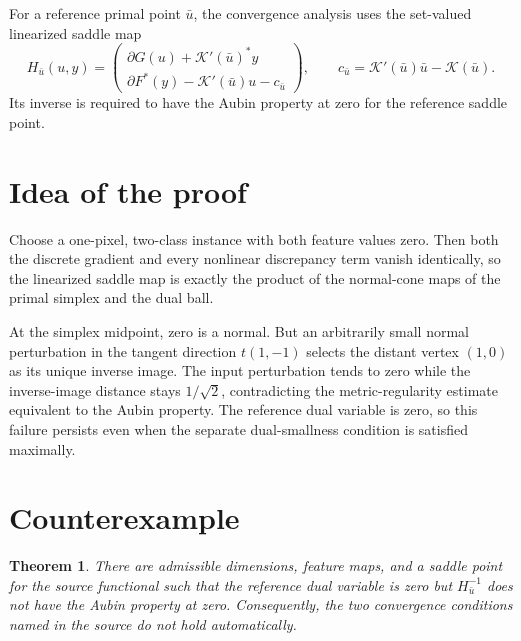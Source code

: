 \documentclass[11pt]{article}
\newtheorem{theorem}{Theorem}
\begin{document}
For a reference primal point \(\bar u\), the convergence analysis
\cite{valkonen} uses the set-valued linearized saddle map
\[
 H_{\bar u}(u,y)=
 \begin{pmatrix}
   \partial G(u)+\mathcal K'(\bar u)^*y\\
   \partial F^*(y)-\mathcal K'(\bar u)u-c_{\bar u}
 \end{pmatrix},
 \qquad
 c_{\bar u}=\mathcal K'(\bar u)\bar u-\mathcal K(\bar u).
\]
Its inverse is required to have the Aubin property at zero for the reference
saddle point.

\section{Idea of the proof}
Choose a one-pixel, two-class instance with both feature values zero.  Then
both the discrete gradient and every nonlinear discrepancy term vanish
identically, so the linearized saddle map is exactly the product of the
normal-cone maps of the primal simplex and the dual ball.

At the simplex midpoint, zero is a normal.  But an arbitrarily small normal
perturbation in the tangent direction \(t(1,-1)\) selects the distant vertex
\((1,0)\) as its unique inverse image.  The input perturbation tends to zero
while the inverse-image distance stays \(1/\sqrt2\), contradicting the
metric-regularity estimate equivalent to the Aubin property.  The reference
dual variable is zero, so this failure persists even when the separate
dual-smallness condition is satisfied maximally.

\section{Counterexample}

\begin{theorem}\label{thm:counterexample}
There are admissible dimensions, feature maps, and a saddle point for the
source functional such that the reference dual variable is zero but
\(H_{\bar u}^{-1}\) does not have the Aubin property at zero. Consequently,
the two convergence conditions named in the source do not hold automatically.
\end{theorem}
\end{document}
